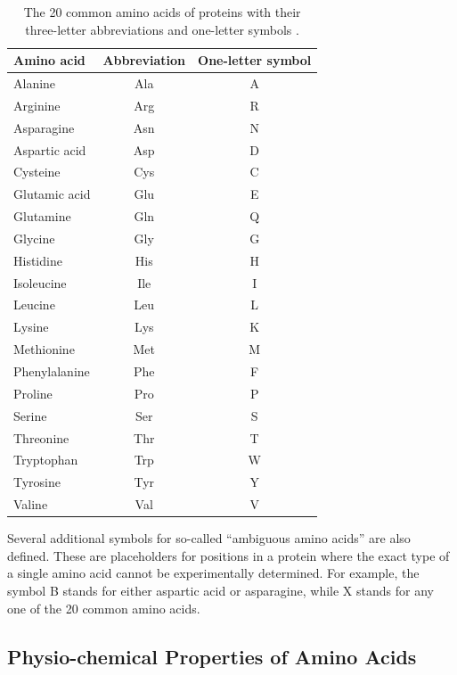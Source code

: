 \begin{table}[h!]
	\centering
	\begin{tabular}{|l|c|c|}
		\firsthline
		Amino acid	  & Abbreviation &
		 One-letter symbol \\ \hline
		Alanine       & Ala  & A   \\
		Arginine      & Arg & R \\
		Asparagine    & Asn & N \\
		Aspartic acid \qquad & Asp & D \\
		Cysteine      & Cys & C \\
		Glutamic acid & Glu & E \\
		Glutamine     & Gln & Q \\
		Glycine       & Gly & G \\
		Histidine     & His & H \\
		Isoleucine    & Ile & I \\
		Leucine       & Leu & L \\
		Lysine        & Lys & K \\
		Methionine    & Met & M \\
		Phenylalanine \quad & Phe & F \\
		Proline       & Pro & P \\
		Serine        & Ser & S \\
		Threonine     & Thr & T \\
		Tryptophan    & Trp & W \\
		Tyrosine      & Tyr & Y \\
		Valine        & Val & V  \\\hline
	\end{tabular}
	\caption[The 20 common amino acids.]{The 20 common amino acids of proteins with their three-letter abbreviations and one-letter symbols \cite{IUPACIUBJointCommissiononBiochemicalNomenclature.1984}.}
 \label{tab:AAlist}
\end{table}


Several additional symbols for so-called ``ambiguous amino acids'' are also defined. These are placeholders for positions in a protein where the exact type of a single amino acid cannot be experimentally determined. For example, the symbol B stands for either aspartic acid or asparagine, while X stands for any one of the 20 common amino acids.






\subsection{Physio-chemical Properties of Amino Acids}
\label{ssec:ppaa}

